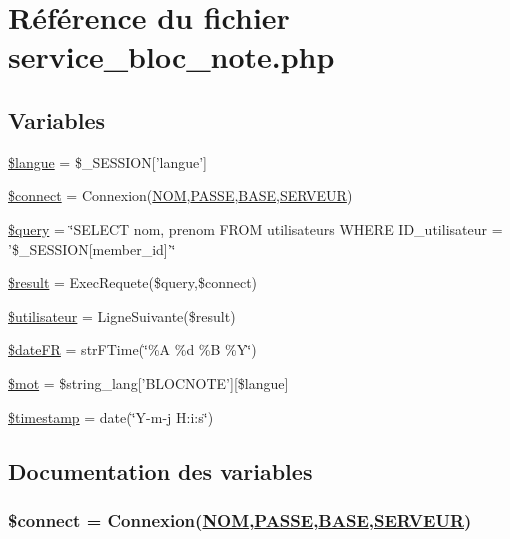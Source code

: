 \hypertarget{service__bloc__note_8php}{
\section{R\'{e}f\'{e}rence du fichier service\_\-bloc\_\-note.php}
\label{service__bloc__note_8php}
}
\subsection*{Variables}
\begin{CompactItemize}
\item 
\hyperlink{service__bloc__note_8php_a0}{\$langue} = \$\_\-SESSION\mbox{[}'langue'\mbox{]}
\item 
\hyperlink{service__bloc__note_8php_a1}{\$connect} = Connexion(\hyperlink{pma__connect_8php_a0}{NOM},\hyperlink{pma__connect_8php_a1}{PASSE},\hyperlink{pma__connect_8php_a3}{BASE},\hyperlink{pma__connect_8php_a2}{SERVEUR})
\item 
\hyperlink{service__bloc__note_8php_a2}{\$query} = \char`\"{}SELECT nom, prenom FROM utilisateurs WHERE ID\_\-utilisateur = '\$\_\-SESSION\mbox{[}member\_\-id\mbox{]}'\char`\"{}
\item 
\hyperlink{service__bloc__note_8php_a3}{\$result} = Exec\-Requete(\$query,\$connect)
\item 
\hyperlink{service__bloc__note_8php_a4}{\$utilisateur} = Ligne\-Suivante(\$result)
\item 
\hyperlink{service__bloc__note_8php_a5}{\$date\-FR} = str\-FTime(\char`\"{}\%A \%d \%B \%Y\char`\"{})
\item 
\hyperlink{service__bloc__note_8php_a6}{\$mot} = \$string\_\-lang\mbox{[}'BLOCNOTE'\mbox{]}\mbox{[}\$langue\mbox{]}
\item 
\hyperlink{service__bloc__note_8php_a7}{\$timestamp} = date(\char`\"{}Y-m-j H:i:s\char`\"{})
\end{CompactItemize}


\subsection{Documentation des variables}
\hypertarget{service__bloc__note_8php_a1}{
\subsubsection[\$connect]{\setlength{\rightskip}{0pt plus 5cm}\$connect = Connexion(\hyperlink{pma__connect_8php_a0}{NOM},\hyperlink{pma__connect_8php_a1}{PASSE},\hyperlink{pma__connect_8php_a3}{BASE},\hyperlink{pma__connect_8php_a2}{SERVEUR})}}
\label{service__bloc__note_8php_a1}


